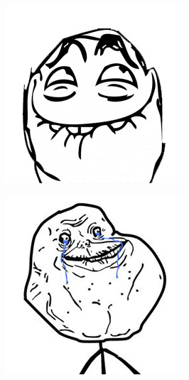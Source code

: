 \begin{multicols}{8}
\begin{center}
\includegraphics[width=\linewidth]{./IMG-GIT/MEMES/Meme-Faces-7.jpg}
\end{center}

\begin{center}
\includegraphics[width=\linewidth]{./IMG-GIT/MEMES/Meme-cara-Forever-Alone.jpg}  
\end{center}


\end{multicols}
